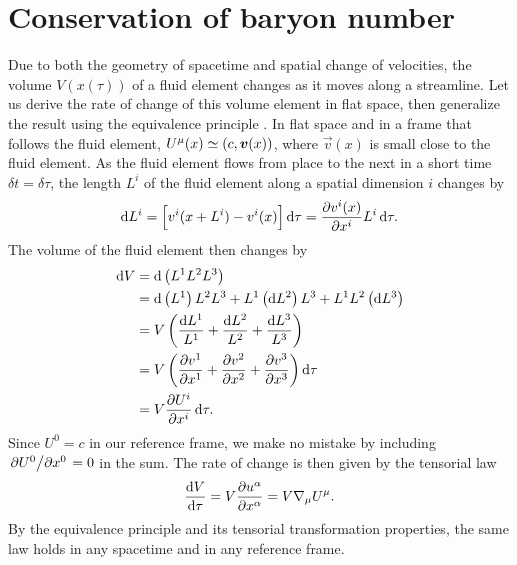 \section{Conservation of baryon number}


Due to both the geometry of spacetime and spatial change of velocities, the volume $V(x(\tau))$ of a fluid element changes as it moves along a streamline.
Let us derive the rate of change of this volume element in flat space, then generalize the result using the equivalence principle .
In flat space and in a frame that follows the fluid element, $U^\mu(x) \simeq (c, {\bm{v}}(x))$, where $\vec{v}(x)$ is small close to the fluid element.
As the fluid element flows from place to the next in a short time $\delta t = \delta \tau$, the length $L^i$ of the fluid element along a spatial dimension $i$ changes by
\begin{equation}
	\mathop{}\!\mathrm{d} L^i = \Big[ v^i(x+L^i) - v^i(x) \Big] \mathop{}\!\mathrm{d} \tau 
	         = \pdv{v^i(x)}{x^i} L^i \mathop{}\!\mathrm{d} \tau.
\end{equation}
The volume of the fluid element then changes by
\begin{equation}
\begin{split}
	\dif V &= \dif \left( L^1 L^2 L^3 \right) \\
	       &= \dif \left( L^1 \right) L^2 L^3 + L^1 \left( \dif L^2 \right) L^3 + L^1 L^2 \left( \dif L^3 \right) \\
	       &= V \left( \frac{\dif L^1}{L^1} + \frac{\dif L^2}{L^2} + \frac{\dif L^3}{L^3} \right) \\
	       &= V \left( \pdv{v^1}{x^1} + \pdv{v^2}{x^2} + \pdv{v^3}{x^3} \right) \dif \tau \\
	       &= V \pdv{U^i}{x^i} \dif \tau .
\end{split}
\end{equation}
Since $U^0 = c$ in our reference frame, we make no mistake by including $\pdv{U^0}/{x^0} = 0$ in the sum.
The rate of change is then given by the tensorial law
\begin{equation}
	\odv{V}{\tau} = V \pdv{u^\alpha}{x^\alpha} = V \nabla_\mu U^\mu .
\label{eq:relfluid:volume_rate_change}
\end{equation}
By the equivalence principle and its tensorial transformation properties, the same law holds in any spacetime and in any reference frame.

